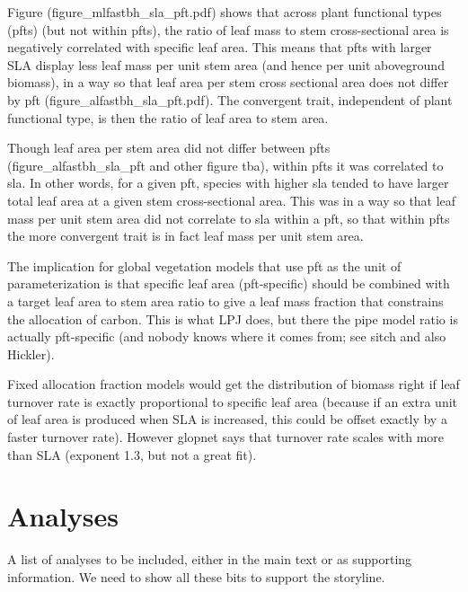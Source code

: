 \documentclass[a4paper]{article}
\begin{document}
Figure (figure\_mlfastbh\_sla\_pft.pdf) shows that across plant functional types (pfts) (but not within pfts), the ratio of leaf mass to stem cross-sectional area is negatively correlated with specific leaf area. This means that pfts with larger SLA display less leaf mass per unit stem area (and hence per unit aboveground biomass), in a way so that leaf area per stem cross sectional area does not differ by pft (figure\_alfastbh\_sla\_pft.pdf). The convergent trait, independent of plant functional type, is then the ratio of leaf area to stem area.

Though leaf area per stem area did not differ between pfts (figure\_alfastbh\_sla\_pft and other figure tba), within pfts it was correlated to sla. In other words, for a given pft, species with higher sla tended to have larger total leaf area at a given stem cross-sectional area. This was in a way so that leaf mass per unit stem area did not correlate to sla within a pft, so that within pfts the more convergent trait is in fact leaf mass per unit stem area.

The implication for global vegetation models that use pft as the unit of parameterization is that specific leaf area (pft-specific) should be combined with a target leaf area to stem area ratio to give a leaf mass fraction that constrains the allocation of carbon. This is what LPJ does, but there the pipe model ratio is actually pft-specific (and nobody knows where it comes from; see sitch and also Hickler).

Fixed allocation fraction models would get the distribution of biomass right if leaf turnover rate is exactly proportional to specific leaf area (because if an extra unit of leaf area is produced when SLA is increased, this could be offset exactly by a faster turnover rate). However glopnet says that turnover rate scales with more than SLA (exponent 1.3, but not a great fit). 



\section{Analyses}

A list of analyses to be included, either in the main text or as supporting information. We need to show all these bits to support the storyline.
\end{document}
